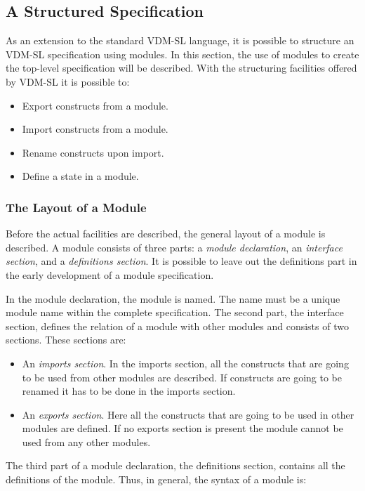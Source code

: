 \documentclass{overturerepchap}
\begin{document}
\subsection{A Structured Specification}

As an extension to the standard VDM-SL language, it is possible to
structure an  VDM-SL specification using modules. In this section,
the use of modules to create the top-level specification will be described.
With the structuring facilities offered by  VDM-SL it is possible to:
\begin{itemize}
\item Export constructs from a module.
\item Import constructs from a module.
\item Rename constructs upon import.
\item Define a state in a module.
\end{itemize}


\subsubsection{The Layout of a Module}

Before the actual facilities are described, the general layout of a
module is described. A module consists of three parts: a {\it module
declaration}, an {\it interface section}, and a {\it definitions
section}. It is possible to leave out the definitions part in the
early development of a module specification.

In the module declaration, the module is named. The name must be a
unique module name within the complete specification. The second
part, the interface section, defines the relation of a module with other
modules and consists of two sections. These sections are:
\begin{itemize}

\item An {\it imports section}. In the imports section, all the
  constructs that are going to be used from other modules are
  described. If constructs are going to be renamed it has to be done
  in the imports section. 

\item An {\it exports section}. Here all the constructs that are going
  to be used in other modules are defined.
  If no exports section is present the
  module cannot be used from any other modules.
\end{itemize}
The third part of a module declaration, the
definitions section, contains all the definitions of the module.
Thus, in general, the syntax of a module is:
\end{document}
